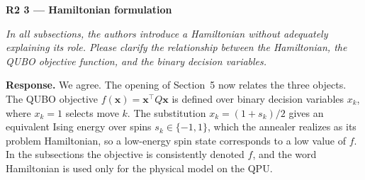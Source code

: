 \documentclass[12pt]{article}
\newenvironment{rc}[1]{\par\medskip\noindent\textbf{#1}\par\nopagebreak\noindent\itshape\renewcommand{\emph}[1]{\textbf{##1}}\ignorespaces}{\par}
\newcommand{\answer}[1]{\par\smallskip\noindent\textbf{Response.} #1\par}
\begin{document}
\begin{rc}{R2 3 --- Hamiltonian formulation}
In all subsections, the authors introduce a Hamiltonian without adequately explaining its role. Please clarify the relationship between the Hamiltonian, the QUBO objective function, and the binary decision variables.
\end{rc}
\answer{We agree. The opening of Section~5 now relates the three objects. The QUBO objective $f(\mathbf{x})=\mathbf{x}^\top Q\mathbf{x}$ is defined over binary decision variables $x_k$, where $x_k=1$ selects move $k$. The substitution $x_k=(1+s_k)/2$ gives an equivalent Ising energy over spins $s_k\in\{-1,1\}$, which the annealer realizes as its problem Hamiltonian, so a low-energy spin state corresponds to a low value of $f$. In the subsections the objective is consistently denoted $f$, and the word Hamiltonian is used only for the physical model on the QPU.}
\end{document}

